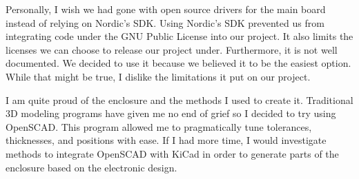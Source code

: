 Personally, I wish we had gone with open source drivers for the main board
instead of relying on Nordic's SDK.  Using Nordic's SDK prevented us from
integrating code under the GNU Public License into our project.  It also limits
the licenses we can choose to release our project under.  Furthermore, it is
not well documented.  We decided to use it because we believed it to be the
easiest option.  While that might be true, I dislike the limitations it put on
our project.

I am quite proud of the enclosure and the methods I used to create it.
Traditional 3D modeling programs have given me no end of grief so I decided to
try using OpenSCAD.  This program allowed me to pragmatically tune tolerances,
thicknesses, and positions with ease.  If I had more time, I would investigate
methods to integrate OpenSCAD with KiCad in order to generate parts of the
enclosure based on the electronic design.
